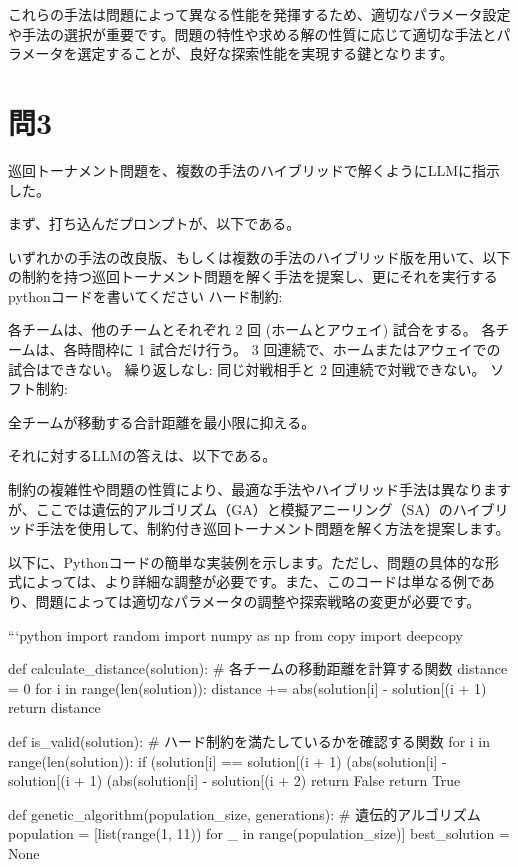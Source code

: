 \documentclass[11pt, twocolumn]{ltjsarticle}
\begin{document}
これらの手法は問題によって異なる性能を発揮するため、適切なパラメータ設定や手法の選択が重要です。問題の特性や求める解の性質に応じて適切な手法とパラメータを選定することが、良好な探索性能を実現する鍵となります。

\section{問3}
巡回トーナメント問題を、複数の手法のハイブリッドで解くようにLLMに指示した。

まず、打ち込んだプロンプトが、以下である。

いずれかの手法の改良版、もしくは複数の手法のハイブリッド版を用いて、以下の制約を持つ巡回トーナメント問題を解く手法を提案し、更にそれを実行するpythonコードを書いてください
ハード制約:

各チームは、他のチームとそれぞれ 2 回 (ホームとアウェイ) 試合をする。
各チームは、各時間枠に 1 試合だけ行う。
3 回連続で、ホームまたはアウェイでの試合はできない。
繰り返しなし: 同じ対戦相手と 2 回連続で対戦できない。
ソフト制約:

全チームが移動する合計距離を最小限に抑える。

それに対するLLMの答えは、以下である。

制約の複雑性や問題の性質により、最適な手法やハイブリッド手法は異なりますが、ここでは遺伝的アルゴリズム（GA）と模擬アニーリング（SA）のハイブリッド手法を使用して、制約付き巡回トーナメント問題を解く方法を提案します。

以下に、Pythonコードの簡単な実装例を示します。ただし、問題の具体的な形式によっては、より詳細な調整が必要です。また、このコードは単なる例であり、問題によっては適切なパラメータの調整や探索戦略の変更が必要です。

```python
import random
import numpy as np
from copy import deepcopy

def calculate_distance(solution):
    # 各チームの移動距離を計算する関数
    distance = 0
    for i in range(len(solution)):
        distance += abs(solution[i] - solution[(i + 1) %
    return distance

def is_valid(solution):
    # ハード制約を満たしているかを確認する関数
    for i in range(len(solution)):
        if (solution[i] == solution[(i + 1) %
           (abs(solution[i] - solution[(i + 1) %
           (abs(solution[i] - solution[(i + 2) %
            return False
    return True

def genetic_algorithm(population_size, generations):
    # 遺伝的アルゴリズム
    population = [list(range(1, 11)) for _ in range(population_size)]
    best_solution = None
\end{document}
